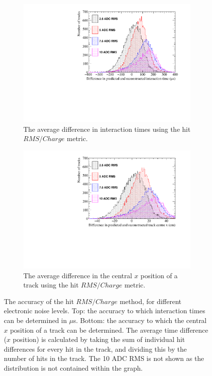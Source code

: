 \begin{figure}
  \centering
  \begin{subfigure}{0.6\textwidth}
    \centering
    \includegraphics[width=\textwidth]{Canvas_AvDiff_T_RMS_Q_NoiseLevel}
    \caption{The average difference in interaction times using the hit $RMS/Charge$ metric.}
    \label{fig:DiffNoiseStudy_AvDiff_RMS_Int_T}
  \end{subfigure}
  \begin{subfigure}{0.6\textwidth}
    \centering
    \includegraphics[width=\textwidth]{Canvas_AvDiff_X_RMS_Q_NoiseLevel}
    \caption{The average difference in the central $x$ position of a track using the hit $RMS/Charge$ metric.}
    \label{fig:DiffNoiseStudy_AvDiff_RMS_Int_X}
  \end{subfigure}
  \caption[Comparing the accuracy of the hit $RMS$ method, as the electronic noise level changes]
          {The accuracy of the hit $RMS/Charge$ method, for different electronic noise levels. Top: the accuracy to which interaction times can be determined in $\mu$s. Bottom: the accuracy to which the central $x$ position of a track can be determined. The average time difference ($x$ position) is calculated by taking the sum of individual hit differences for every hit in the track, and dividing this by the number of hits in the track. The 10 ADC RMS is not shown as the distribution is not contained within the graph.}
  \label{fig:DiffNoiseStudy_AvDiff_RMS_Int}
\end{figure}

